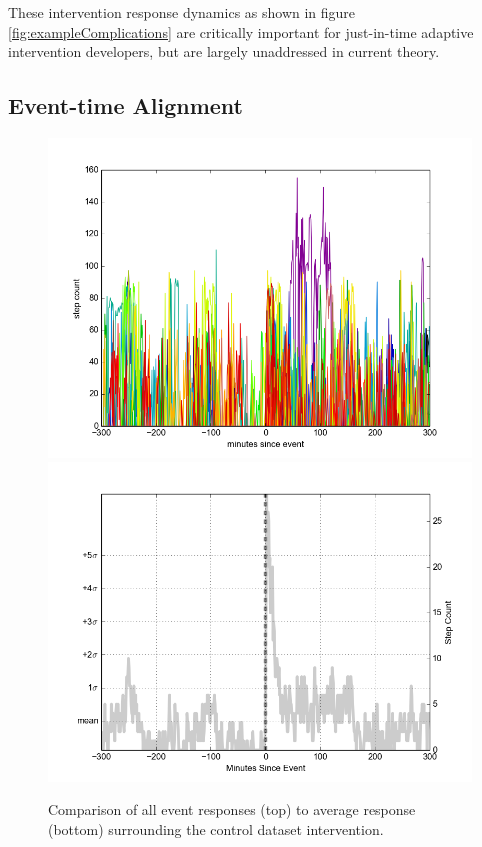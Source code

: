 \documentclass[review,journal]{vgtc}         %
\begin{document}
These intervention response dynamics as shown in figure \ref{fig:exampleComplications} are critically important for just-in-time adaptive intervention developers, but are largely unaddressed in current theory.

\subsection{Event-time Alignment}

\begin{figure}
\centering
\includegraphics[width=0.9\columnwidth]{./img/perfect_intervention_individual_events.png}
\includegraphics[width=0.9\columnwidth]{./img/perfect_intervention.png}
\caption{Comparison of all event responses (top) to average response (bottom) surrounding the control dataset intervention.}
\label{fig:interventionAverage}
\end{figure}
\end{document}
